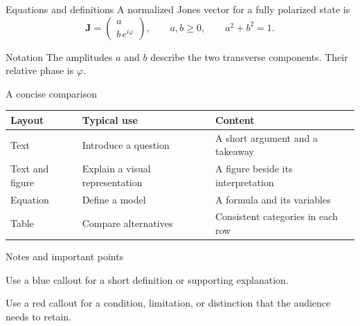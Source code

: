 \documentclass[aspectratio=\BeamerAspectRatio]{beamer}
\begin{document}
\begin{frame}{Equations and definitions}
  A normalized Jones vector for a fully polarized state is
  \[
    \mathbf{J}=\begin{pmatrix}a\\b\,e^{i\varphi}\end{pmatrix},
    \qquad a,b\geq 0,\qquad a^2+b^2=1.
  \]
  \vspace{2mm}
  \begin{block}{Notation}
    The amplitudes $a$ and $b$ describe the two transverse components.
    Their relative phase is $\varphi$.
  \end{block}
\end{frame}

\begin{frame}{A concise comparison}
  \begin{tabularx}{\textwidth}{@{}P{.20\textwidth}Y Y@{}}
    \toprule
    \textbf{Layout} & \textbf{Typical use} & \textbf{Content} \\
    \midrule
    Text & Introduce a question & A short argument and a takeaway \\
    Text and figure & Explain a visual representation & A figure beside its interpretation \\
    Equation & Define a model & A formula and its variables \\
    Table & Compare alternatives & Consistent categories in each row \\
    \bottomrule
  \end{tabularx}
  \vspace{3mm}
\end{frame}

\begin{frame}{Notes and important points}
  \begin{mynote}[Definition]
    Use a blue callout for a short definition or supporting explanation.
  \end{mynote}
  \vspace{3mm}
  \begin{myalert}
    Use a red callout for a condition, limitation, or distinction that the audience needs to retain.
  \end{myalert}
\end{frame}
\end{document}

